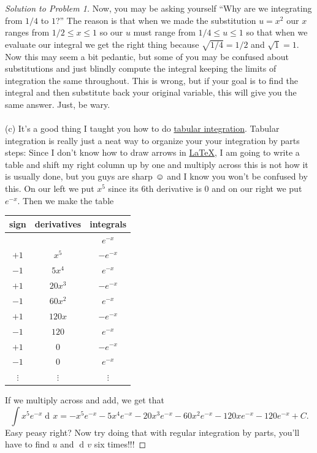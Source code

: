 \documentclass[12pt]{article}
\theoremstyle{plain}
\theoremstyle{definition}
\theoremstyle{remark}
\DeclareMathOperator{\diff}{d\!}
\begin{document}
\begin{proof}[Solution to Problem 1]
Now, you may be asking yourself ``Why are we integrating from $1/4$ to
$1$?'' The reason is that when we made the substitution $u=x^2$ our $x$
ranges from $1/2\leq x\leq 1$ so our $u$ must range from $1/4\leq u\leq 1$
so that when we evaluate our integral we get the right thing because
$\sqrt{1/4}=1/2$ and $\sqrt{1}=1$. Now this may seem a bit pedantic, but
some of you may be confused about substitutions and just blindly compute
the integral keeping the limits of integration the same throughout. This is
wrong, but if your goal is to find the integral and then substitute back
your original variable, this will give you the same answer. Just, be wary.
\\\\
(c) It's a good thing I taught you how to do
\href{https://en.wikipedia.org/wiki/Integration_by_parts#Tabular_integration_by_parts}{tabular
  integration}. Tabular integration is really just a neat way to organize
your your integration by parts steps: Since I don't know how to draw arrows
in \href{https://en.wikipedia.org/wiki/LaTeX}{\LaTeX}, I am going to write
a table and shift my right column up by one and multiply across this is not
how it is usually done, but you guys are sharp $\smiley$ and I know you
won't be confused by this. On our left we put $x^5$ since its $6$th
derivative is $0$ and on our right we put $e^{-x}$. Then we make the table
\begin{center}
\begin{tabular}{|c|c|c|}
\hline
sign&derivatives&integrals\\
\hline
~&~&$e^{-x}$\\
$+1$&$x^5$&$-e^{-x}$\\
$-1$&$5x^4$&$e^{-x}$\\
$+1$&$20x^3$&$-e^{-x}$\\
$-1$&$60x^2$&$e^{-x}$\\
$+1$&$120x$&$-e^{-x}$\\
$-1$&$120$&$e^{-x}$\\
$+1$&$0$&$-e^{-x}$\\
$-1$&$0$&$e^{-x}$\\
$\vdots$&$\vdots$&$\vdots$\\
\hline
\end{tabular}
\end{center}
If we multiply across and add, we get that
\[
\int x^5e^{-x}\diff x=
\boxed{-x^5e^{-x}-5x^4e^{-x}-20x^3e^{-x}-60x^2e^{-x}-120xe^{-x}-120e^{-x}+C.}
\]
Easy peasy right? Now try doing that with regular integration by parts,
you'll have to find $u$ and $\diff v$ six times!!!

\end{proof}
\end{document}
